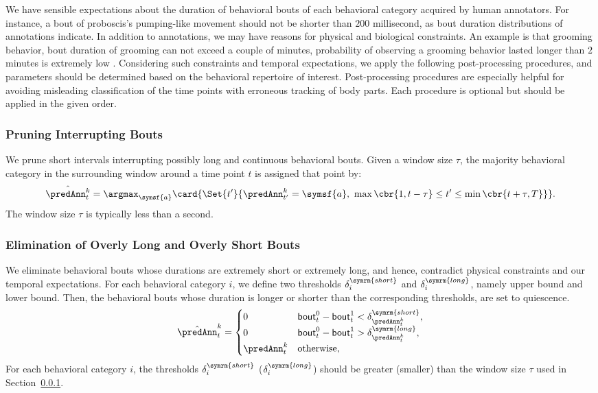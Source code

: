We have sensible expectations about the duration of behavioral bouts of each behavioral category acquired by human annotators.
For instance, a bout of proboscis's pumping-like movement should not be shorter than $200$ millisecond, as bout duration distributions of annotations indicate.
In addition to annotations, we may have reasons for physical and biological constraints.
An example is that grooming behavior, bout duration of grooming can not exceed a couple of minutes, probability of observing a grooming behavior lasted longer than $2$ minutes is extremely low \citep{qiao_automated_2018}.
Considering such constraints and temporal expectations, we apply the following post-processing procedures, and parameters should be determined based on the behavioral repertoire of interest.
Post-processing procedures are especially helpful for avoiding misleading classification of the time points with erroneous tracking of body parts.
Each procedure is optional but should be applied in the given order.

\subsubsection{Pruning Interrupting Bouts}\label{section:pruning-interrupting-bouts}
We prune short intervals interrupting possibly long and continuous behavioral bouts.
Given a window size $\tau$, the majority behavioral category in the surrounding window around a time point $t$ is assigned that point by:
\begin{equation}
	\hat{\predAnn^k_t} = \argmax_{\symsf{a}} \card{\Set{t^\prime}{\predAnn^k_{t^\prime}=\symsf{a}, \ \max\cbr{1, t-\tau} \leq t^\prime \leq \min\cbr{t+\tau, T}}}.
\end{equation}
The window size $\tau$ is typically less than a second.

\subsubsection{Elimination of Overly Long and Overly Short Bouts}
We eliminate behavioral bouts whose durations are extremely short or extremely long, and hence, contradict physical constraints and our temporal expectations.
For each behavioral category $i$, we define two thresholds $\delta^{\symrm{short}}_i$ and $\delta^{\symrm{long}}_i$, namely upper bound and lower bound.
Then, the behavioral bouts whose duration is longer or shorter than the corresponding thresholds, are set to quiescence.
\begin{equation}
	\hat{\predAnn}^k_t=
	\begin{cases}
		0            & \mathsf{bout}^0_t - \mathsf{bout}^1_t < \delta^{\symrm{short}}_{\predAnn^k_t}, \\
		0            & \mathsf{bout}^0_t - \mathsf{bout}^1_t > \delta^{\symrm{long}}_{\predAnn^k_t},  \\
		\predAnn^k_t & \textnormal{otherwise},
	\end{cases}
\end{equation}
For each behavioral category $i$, the thresholds $\delta^{\symrm{short}}_i$ ($\delta^{\symrm{long}}_i$) should be greater (smaller) than the window size $\tau$ used in Section~\ref{section:pruning-interrupting-bouts}.
